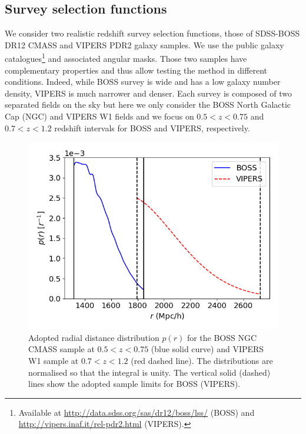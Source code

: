 \documentclass{aa}
\begin{document}
\subsection{Survey selection functions}

We consider two realistic redshift survey selection functions, those of SDSS-BOSS DR12 CMASS \citep{alam15} and VIPERS PDR2 \citep{scodeggio18} galaxy samples. We use the public galaxy catalogues\footnote{Available at \url{http://data.sdss.org/sas/dr12/boss/lss/} (BOSS) and \url{http://vipers.inaf.it/rel-pdr2.html} (VIPERS).} and associated angular masks. Those two samples have complementary properties and thus allow testing the method in different conditions. Indeed, while BOSS survey is wide and has a low galaxy number density, VIPERS is much narrower and denser. Each survey is composed of two separated fields on the sky but here we only consider the BOSS North Galactic Cap (NGC) and VIPERS W1 fields and we focus on $0.5<z<0.75$ and $0.7<z<1.2$ redshift intervals for BOSS and VIPERS, respectively.
%
\begin{figure}
\includegraphics[width=\columnwidth]{Figures/fig_nr_random0_DR12v5_CMASS_North_spline_nbins100_nr_VIPERS_analytical.png} 
    \caption{Adopted radial distance distribution $p(r)$ for the BOSS NGC CMASS sample at $0.5<z<0.75$ (blue solid curve) and VIPERS W1 sample at $0.7<z<1.2$ (red dashed line). The distributions are normalised so that the integral is unity. The vertical solid (dashed) lines show the adopted sample limits for BOSS (VIPERS).}
    \label{fig:nr_surveys}
\end{figure}
%
\end{document}

